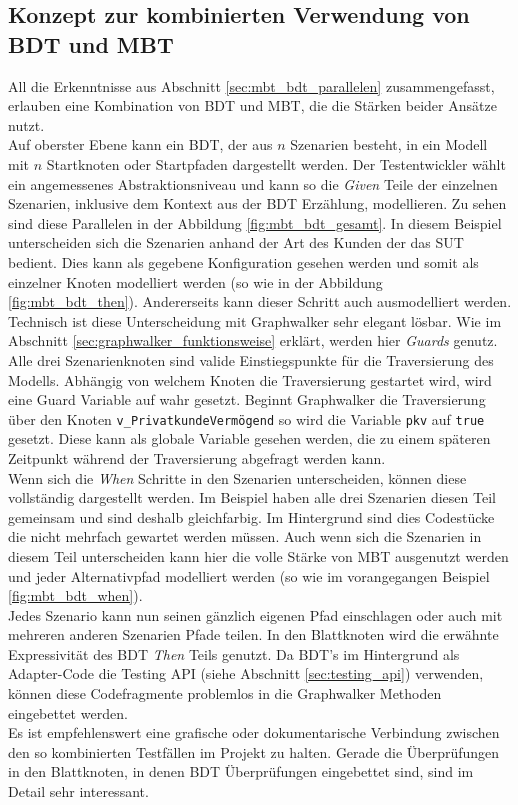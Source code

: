 \subsection{Konzept zur kombinierten Verwendung von BDT und MBT}
\label{sec:mbt_bdt_concept}
All die Erkenntnisse aus Abschnitt \ref{sec:mbt_bdt_parallelen} zusammengefasst, erlauben eine Kombination von \Gls{BDT} und \Gls{MBT}, die die Stärken beider Ansätze nutzt.\\
Auf oberster Ebene kann ein \Gls{BDT}, der aus $n$ Szenarien besteht, in ein Modell mit $n$ Startknoten oder Startpfaden dargestellt werden. Der Testentwickler wählt ein angemessenes Abstraktionsniveau und kann so die \textit{Given} Teile der einzelnen Szenarien, inklusive dem Kontext aus der \Gls{BDT} Erzählung, modellieren. Zu sehen sind diese Parallelen in der Abbildung \ref{fig:mbt_bdt_gesamt}. In diesem Beispiel unterscheiden sich die Szenarien anhand der Art des Kunden der das \Gls{SUT} bedient. Dies kann als gegebene Konfiguration gesehen werden und somit als einzelner Knoten modelliert werden (so wie in der Abbildung \ref{fig:mbt_bdt_then}). Andererseits kann dieser Schritt auch ausmodelliert werden. Technisch ist diese Unterscheidung mit Graphwalker sehr elegant lösbar. Wie im Abschnitt \ref{sec:graphwalker_funktionsweise}  erklärt, werden hier \textit{Guards} genutz. Alle drei Szenarienknoten sind valide Einstiegspunkte für die Traversierung des Modells. Abhängig von welchem Knoten die Traversierung gestartet wird, wird eine Guard Variable auf wahr gesetzt. Beginnt Graphwalker die Traversierung über den Knoten \texttt{v\_PrivatkundeVermögend} so wird die Variable \texttt{pkv} auf \texttt{true} gesetzt. Diese kann als globale Variable gesehen werden, die zu einem späteren Zeitpunkt während der Traversierung abgefragt werden kann.\\
Wenn sich die \textit{When} Schritte in den Szenarien unterscheiden, können diese vollständig dargestellt werden. Im Beispiel haben alle drei Szenarien diesen Teil gemeinsam und sind deshalb gleichfarbig. Im Hintergrund sind dies Codestücke die nicht mehrfach gewartet werden müssen. Auch wenn sich die Szenarien in diesem Teil unterscheiden kann hier die volle Stärke von \Gls{MBT} ausgenutzt werden und jeder Alternativpfad modelliert werden (so wie im vorangegangen Beispiel \ref{fig:mbt_bdt_when}).\\
Jedes Szenario kann nun seinen gänzlich eigenen Pfad einschlagen oder auch mit mehreren anderen Szenarien Pfade teilen. In den Blattknoten wird die erwähnte Expressivität des \Gls{BDT} \textit{Then} Teils genutzt. Da \Gls{BDT}'s im Hintergrund als Adapter-Code die Testing API (siehe Abschnitt \ref{sec:testing_api}) verwenden, können diese Codefragmente problemlos in die Graphwalker Methoden eingebettet werden.\\
Es ist empfehlenswert eine grafische oder dokumentarische Verbindung zwischen den so kombinierten Testfällen im Projekt zu halten. Gerade die Überprüfungen in den Blattknoten, in denen \Gls{BDT} Überprüfungen eingebettet sind, sind im Detail sehr interessant.

